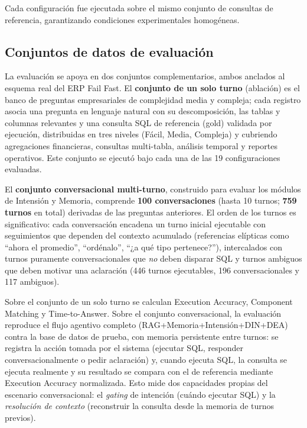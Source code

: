 \documentclass[journal]{IEEEtran}
\begin{document}
Cada configuración fue ejecutada sobre el mismo conjunto de consultas de referencia, garantizando condiciones experimentales homogéneas.

\subsection{Conjuntos de datos de evaluación}
\label{sec:datasets}

La evaluación se apoya en dos conjuntos complementarios, ambos anclados al esquema real del ERP Fail Fast. El \textbf{conjunto de un solo turno} (ablación) es el banco de preguntas empresariales de complejidad media y compleja; cada registro asocia una pregunta en lenguaje natural con su descomposición, las tablas y columnas relevantes y una consulta SQL de referencia (gold) validada por ejecución, distribuidas en tres niveles (Fácil, Media, Compleja) y cubriendo agregaciones financieras, consultas multi-tabla, análisis temporal y reportes operativos. Este conjunto se ejecutó bajo cada una de las 19 configuraciones evaluadas.

El \textbf{conjunto conversacional multi-turno}, construido para evaluar los módulos de Intensión y Memoria, comprende \textbf{100 conversaciones} (hasta 10 turnos; \textbf{759 turnos} en total) derivadas de las preguntas anteriores. El orden de los turnos es significativo: cada conversación encadena un turno inicial ejecutable con seguimientos que dependen del contexto acumulado (referencias elípticas como ``ahora el promedio'', ``ordénalo'', ``¿a qué tipo pertenece?''), intercalados con turnos puramente conversacionales que \emph{no} deben disparar SQL y turnos ambiguos que deben motivar una aclaración (446 turnos ejecutables, 196 conversacionales y 117 ambiguos).

Sobre el conjunto de un solo turno se calculan Execution Accuracy, Component Matching y Time-to-Answer. Sobre el conjunto conversacional, la evaluación reproduce el flujo agentivo completo (RAG+Memoria+Intensión+DIN+DEA) contra la base de datos de prueba, con memoria persistente entre turnos: se registra la acción tomada por el sistema (ejecutar SQL, responder conversacionalmente o pedir aclaración) y, cuando ejecuta SQL, la consulta se ejecuta realmente y su resultado se compara con el de referencia mediante Execution Accuracy normalizada. Esto mide dos capacidades propias del escenario conversacional: el \emph{gating} de intención (cuándo ejecutar SQL) y la \emph{resolución de contexto} (reconstruir la consulta desde la memoria de turnos previos).
\end{document}

